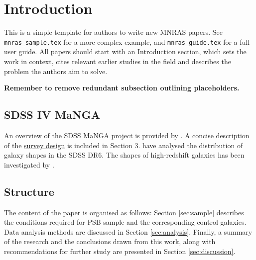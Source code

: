 \section{Introduction}
\label{sec:introduction}

\par This is a simple template for authors to write new MNRAS papers.
See \texttt{mnras\_sample.tex} for a more complex example, and \texttt{mnras\_guide.tex}
for a full user guide. All papers should start with an Introduction section, which sets the work in context, cites relevant earlier studies in the field and describes the problem the authors aim to solve.

\vspace{10pt}
\textbf{Remember to remove redundant subsection outlining placeholders.}

\subsection{SDSS IV MaNGA}
An overview of the SDSS MaNGA project is provided by \citet{Bundy_2014}. A concise description of the \href{https://iopscience.iop.org/article/10.1088/0004-637X/798/1/7/meta#apj504473s3}{survey design} is included in Section 3. \citet{2008MNRAS.388.1321P} have analysed the distribution of galaxy shapes in the SDSS DR6. The shapes of high-redshift galaxies has been investigated by \citet{2012ApJ...754L..24C}.



\subsection{Structure}
The content of the paper is organised as follows: Section \ref{sec:sample} describes the conditions required for PSB sample and the corresponding control galaxies. Data analysis methods are discussed in Section \ref{sec:analysis}. Finally, a summary of the research and the conclusions drawn from this work, along with recommendations for further study are presented in Section \ref{sec:discussion}.
